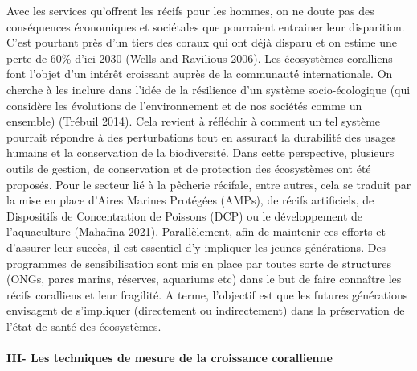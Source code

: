 \documentclass[]{article}
\let\oldparagraph\paragraph
\renewcommand{\paragraph}[1]{\oldparagraph{#1}\mbox{}}
\begin{document}
Avec les services qu'offrent les récifs pour les hommes, on ne doute pas
des conséquences économiques et sociétales que pourraient entrainer leur
disparition. C'est pourtant près d'un tiers des coraux qui ont déjà
disparu et on estime une perte de 60\% d'ici 2030 (Wells and Ravilious
2006). Les écosystèmes coralliens font l'objet d'un intérêt croissant
auprès de la communauté́ internationale. On cherche à les inclure dans
l'idée de la résilience d'un système socio-écologique (qui considère les
évolutions de l'environnement et de nos sociétés comme un ensemble)
(Trébuil 2014). Cela revient à réfléchir à comment un tel système
pourrait répondre à des perturbations tout en assurant la durabilité des
usages humains et la conservation de la biodiversité. Dans cette
perspective, plusieurs outils de gestion, de conservation et de
protection des écosystèmes ont été proposés. Pour le secteur lié à la
pêcherie récifale, entre autres, cela se traduit par la mise en place
d'Aires Marines Protégées (AMPs), de récifs artificiels, de Dispositifs
de Concentration de Poissons (DCP) ou le développement de l'aquaculture
(Mahafina 2021). Parallèlement, afin de maintenir ces efforts et
d'assurer leur succès, il est essentiel d'y impliquer les jeunes
générations. Des programmes de sensibilisation sont mis en place par
toutes sorte de structures (ONGs, parcs marins, réserves, aquariums etc)
dans le but de faire connaître les récifs coralliens et leur fragilité.
A terme, l'objectif est que les futures générations envisagent de
s'impliquer (directement ou indirectement) dans la préservation de
l'état de santé des écosystèmes.

\hypertarget{iii--les-techniques-de-mesure-de-la-croissance-corallienne}{%
\paragraph{III- Les techniques de mesure de la croissance corallienne
}\label{iii--les-techniques-de-mesure-de-la-croissance-corallienne}}
\end{document}

